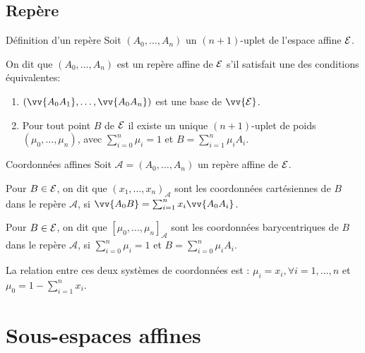 \documentclass[
bigger]{m53beamer}
\begin{document}
\subsection{Repère}
  \begin{frame}{Définition d'un repère}
    Soit $(A_{0},\ldots,A_{n})$ un $(n+1)$-uplet de l'espace affine $\mathcal{E}$.\pause\\
    \begin{defprop}
      On dit que $(A_{0},\ldots,A_{n})$ est \alert{un repère affine} de $\mathcal{E}$ s'il satisfait une des conditions équivalentes:
      \begin{enumerate}[<+(1)->]
        \item $(\vv{A_{0}A_{1}},\ldots,\vv{A_{0}A_{n}})$ est une base de $\vv{\ens{E}}$.
        \item Pour tout point $B$ de $\mathcal{E}$ il existe un unique $(n+1)$-uplet de poids $(\mu_{0},\ldots,\mu_{n})$, avec $\sum_{i=0}^{n}\mu_{i}=1$ et $B=\sum_{i=1}^{n}\mu_{i}A_{i}$.
      \end{enumerate}
    \end{defprop}
  \end{frame}
  \begin{frame}{Coordonnées affines}
    Soit $\mathcal{A}=(A_{0},\ldots,A_{n})$ un repère affine de $\mathcal{E}$.\pause\\
    \begin{definition}
      Pour $B \in \mathcal{E}$, on dit que $(x_{1},\ldots,x_{n})_{\mathcal{A}}$ sont les \alert{coordonnées cartésiennes} de $B$ dans le repère $\mathcal{A}$, si $\vv{A_{0}B} = \sum_{i=1}^{n} x_{i}\vv{A_{0}A_{i}}$.
    \end{definition}\pause
    \begin{definition}
      Pour $B \in \mathcal{E}$, on dit que $[\mu_{0},\ldots,\mu_{n}]_{\mathcal{A}}$ sont les \alert{coordonnées barycentriques} de $B$ dans le repère $\mathcal{A}$, si $\sum_{i=0}^{n}\mu_{i}=1$ et $B=\sum_{i=0}^{n}\mu_{i}A_{i}$.
    \end{definition}\pause
    La relation entre ces deux systèmes de coordonnées est : $\mu_{i}=x_{i}, \forall i=1,\ldots,n$ et $\mu_{0}=1-\sum_{i=1}^{n}x_{i}$.
  \end{frame}

\section{Sous-espaces affines}
\end{document}
